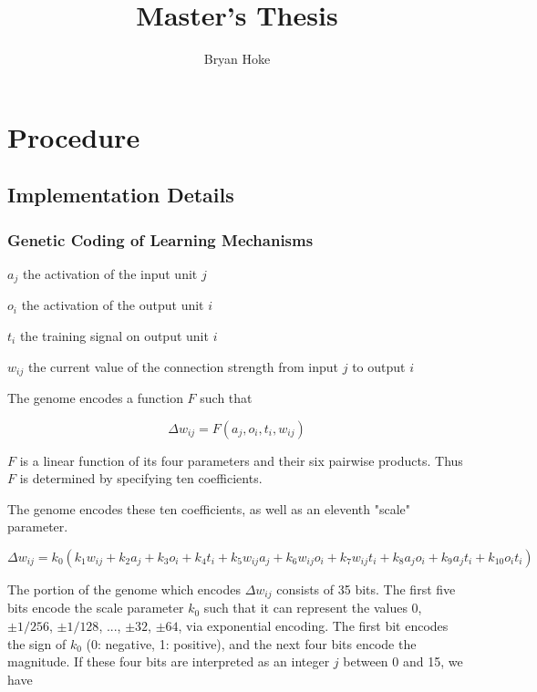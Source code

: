 \documentclass[master]{outhesis}
\title{Master's Thesis}
\author{Bryan Hoke}
\begin{document}
\makefrontmatter

\chapter{Procedure}

\section{Implementation Details}

\subsection{Genetic Coding of Learning Mechanisms}

\begin{center}
	$a_j$ the activation of the input unit $j$
\end{center}

\begin{center}
	$o_i$ the activation of the output unit $i$
\end{center}

\begin{center}
	$t_i$ the training signal on output unit $i$
\end{center}

\begin{center}
	$w_{ij}$ the current value of the connection strength from input $j$ to output $i$
\end{center}

The genome encodes a function $F$ such that

\[
	\Delta w_{ij} = F(a_j, o_i, t_i, w_{ij})
\]

$F$ is a linear function of its four parameters and their six pairwise products. Thus $F$ is determined by specifying ten coefficients.

The genome encodes these ten coefficients, as well as an eleventh "scale" parameter.

\[
	\Delta w_{ij} = k_0(k_1w_{ij}+k_2a_j+k_3o_i+k_4t_i+k_5w_{ij}a_j+k_6w_{ij}o_i+k_7w_{ij}t_{i}+k_8a_jo_i+k_9a_jt_i+k_{10}o_it_i)
\]

The portion of the genome which encodes $\Delta w_{ij}$ consists of 35 bits. The first five bits encode the scale parameter $k_0$ such that it can represent the values $0$, $\pm 1/256$, $\pm 1/128$, ..., $\pm 32$, $\pm 64$, via exponential encoding. The first bit encodes the sign of $k_0$ (0: negative, 1: positive), and the next four bits encode the magnitude. If these four bits are interpreted as an integer $j$ between 0 and 15, we have
\end{document}
